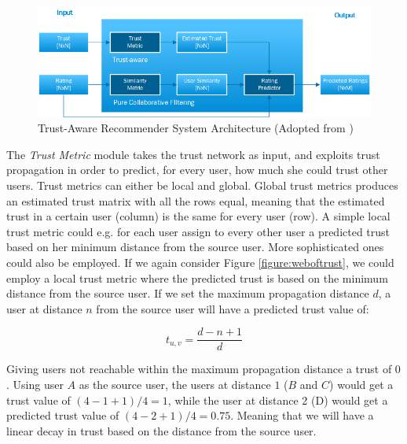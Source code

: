 \begin{figure}[H]
    \includegraphics[width=5in]{image/trustawarearchitecture.png}
    \centering
    \caption[Trust-Aware Recommender System Architecture]{Trust-Aware
    Recommender System Architecture (Adopted from \cite{Massa2004})}
    \label{figure:trustarchictecture}
\end{figure}

The \emph{Trust Metric} module takes the trust network as input, and exploits
trust propagation in order to predict, for every user, how much she could trust
other users. Trust metrics can either be local and global. Global trust metrics
produces an estimated trust matrix with all the rows equal, meaning that the
estimated trust in a certain user (column) is the same for every user (row). A
simple local trust metric could e.g. for each user assign to every other user a
predicted trust based on her minimum distance from the source user. More
sophisticated ones could also be employed. If we again consider Figure
\ref{figure:weboftrust}, we could employ a local trust metric where the
predicted trust is based on the minimum distance from the source user. If we
set the maximum propagation distance $d$, a user at distance $n$ from the
source user will have a predicted trust value of:

\begin{equation}
t_{u,v} = \frac{d-n+1}{d}
\end{equation}

Giving users not reachable within the maximum propagation distance a trust of
$0$. Using user $A$ as the source user, the users at distance $1$ ($B$ and $C$)
would get a trust value of $(4-1+1)/4 = 1$, while the user at distance 2 (D)
would get a predicted trust value of $(4-2+1)/4 = 0.75$. Meaning that we will
have a linear decay in trust based on the distance from the source user.

